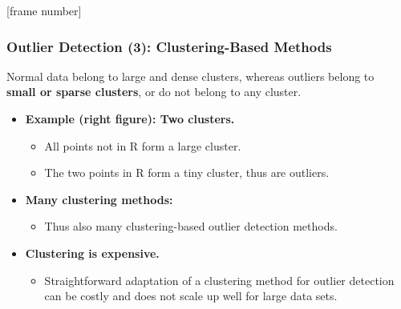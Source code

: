 \documentclass[aspectratio=169,t,xcolor=dvipsnames]{beamer}
\begin{document}
{
[frame number]
\begin{frame}
	\frametitle{Outlier Detection (3): Clustering-Based Methods}
	Normal data belong to large and dense clusters, whereas outliers belong to\\ \textbf{\color{airforceblue}small or sparse clusters}, or do not belong to any cluster.
	\begin{itemize}

	\item \textbf{Example (right figure): Two clusters.}
	\begin{itemize}
		\item All points not in R form a large cluster.
		\item The two points in R form a tiny cluster, thus are outliers.

	\end{itemize}
	\item \textbf{Many clustering methods:}
	\begin{itemize}
		\item Thus also many clustering-based outlier detection methods.
	\end{itemize}
	\item \textbf{Clustering is expensive.}
	\begin{itemize}
		\item Straightforward adaptation of a clustering method for outlier detection can be costly and does not scale up well for large data sets.
	\end{itemize}
	\end{itemize}


\end{frame}}
\end{document}
